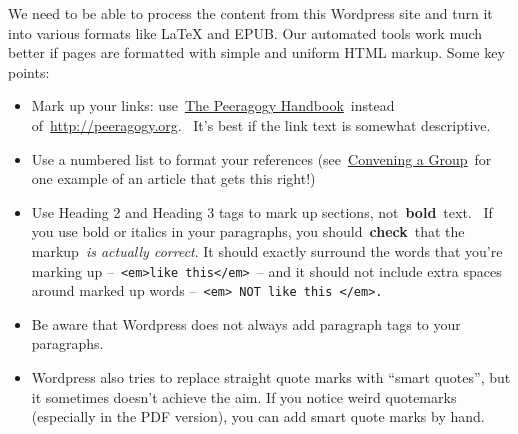 We need to be able to process the content from this Wordpress site and
turn it into various formats like LaTeX and EPUB. Our automated tools
work much better if pages are formatted with simple and uniform HTML
markup. Some key points:

\begin{itemize}
\itemsep1pt\parskip0pt
\item
  Mark up your links: use~\href{http://peeragogy.org}{The Peeragogy
  Handbook}~instead of~\url{http://peeragogy.org}.~ It's best if the
  link text is somewhat descriptive.
\item
  Use a numbered list to format your references
  (see~\href{http://peeragogy.org/convening-a-group/}{Convening a
  Group}~for one example of an article that gets this right!)
\item
  Use Heading 2 and Heading 3 tags to mark up sections,
  not~\textbf{bold}~text.~ If you use bold or italics in your
  paragraphs, you should~\textbf{check}~that the markup~\emph{is
  actually correct}. It should exactly surround the words that you're
  marking up
  --~\texttt{\textless{}em\textgreater{}like this\textless{}/em\textgreater{}}~--
  and it should not include extra spaces around marked up words
  --~\texttt{\textless{}em\textgreater{} NOT like this \textless{}/em\textgreater{}.}
\item
  Be aware that Wordpress does not always add paragraph tags to your
  paragraphs.
\item
  Wordpress also tries to replace straight quote marks with ``smart
  quotes'', but it sometimes doesn't achieve the aim. If you notice
  weird quotemarks (especially in the PDF version), you can add smart
  quote marks by hand.
\end{itemize}

~
